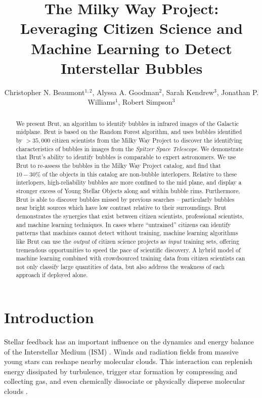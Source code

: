 \documentclass[preprint]{aastex}
\begin{document}
\title{The Milky Way Project: Leveraging Citizen Science and Machine Learning to Detect Interstellar Bubbles}

\author{Christopher N. Beaumont$^{1,2}$, Alyssa A. Goodman$^2$, Sarah Kendrew$^3$, Jonathan P. Williams$^1$, Robert Simpson$^3$}

\begin{abstract}
We present Brut, an algorithm to identify bubbles in infrared images of the Galactic midplane. Brut is based on the Random Forest algorithm, and uses bubbles identified by $>35,000$ citizen scientists from the Milky Way Project to discover the identifying characteristics of bubbles in images from the \textit{Spitzer Space Telescope}. We demonstrate that Brut's ability to identify bubbles is comparable to expert astronomers. We use Brut to re-assess the bubbles in the Milky Way Project catalog, and find that $10-30\%$ of the objects in this catalog are non-bubble interlopers. Relative to these interlopers, high-reliability bubbles are more confined to the mid plane, and display a stronger excess of Young Stellar Objects along and within bubble rims. Furthermore, Brut is able to discover bubbles missed by previous searches -- particularly bubbles near bright sources which have low contrast relative to their surroundings. Brut demonstrates the synergies that exist between citizen scientists, professional scientists, and machine learning techniques. In cases where ``untrained'' citizens can identify patterns that machines cannot detect without training, machine learning algorithms like Brut can use the \emph{output} of citizen science projects as \emph{input} training sets, offering tremendous opportunities to speed the pace of scientific discovery. A hybrid model of machine learning combined with crowdsourced training data from citizen scientists can not only classify large quantities of data, but also address the weakness of each approach if deployed alone.
\end{abstract}

\section{Introduction}
\label{sec:intro}
Stellar feedback has an important influence on the dynamics and energy balance of the Interstellar Medium (ISM) \citep{Zinnecker07}. Winds and radiation fields from massive young stars can reshape nearby molecular clouds. This interaction can replenish energy dissipated by turbulence, trigger star formation by compressing and collecting gas, and even chemically dissociate or physically disperse molecular clouds \citep{Matzner02}.
\end{document}
